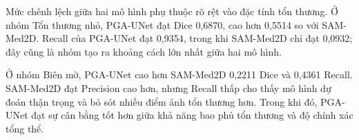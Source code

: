\begin{table}[H]
    \centering
    \caption{So sánh PGA-UNet với SAM-Med2D theo đặc tính tổn thương ở cùng độ phân giải $256\times256$ trên BTXRD (Bao trọn, 50 ảnh/nhóm)}
    \label{tab:subcat_sam_256}
    \renewcommand{\arraystretch}{1.3}
\end{table}

Mức chênh lệch giữa hai mô hình phụ thuộc rõ rệt vào đặc tính tổn thương. Ở nhóm Tổn thương nhỏ, PGA-UNet đạt Dice 0,6870, cao hơn 0,5514 so với SAM-Med2D. Recall của PGA-UNet đạt 0,9354, trong khi SAM-Med2D chỉ đạt 0,0932; đây cũng là nhóm tạo ra khoảng cách lớn nhất giữa hai mô hình.

Ở nhóm Biên mờ, PGA-UNet cao hơn SAM-Med2D 0,2211 Dice và 0,4361 Recall. SAM-Med2D đạt Precision cao hơn, nhưng Recall thấp cho thấy mô hình dự đoán thận trọng và bỏ sót nhiều điểm ảnh tổn thương hơn. Trong khi đó, PGA-UNet đạt sự cân bằng tốt hơn giữa khả năng bao phủ tổn thương và độ chính xác tổng thể.

